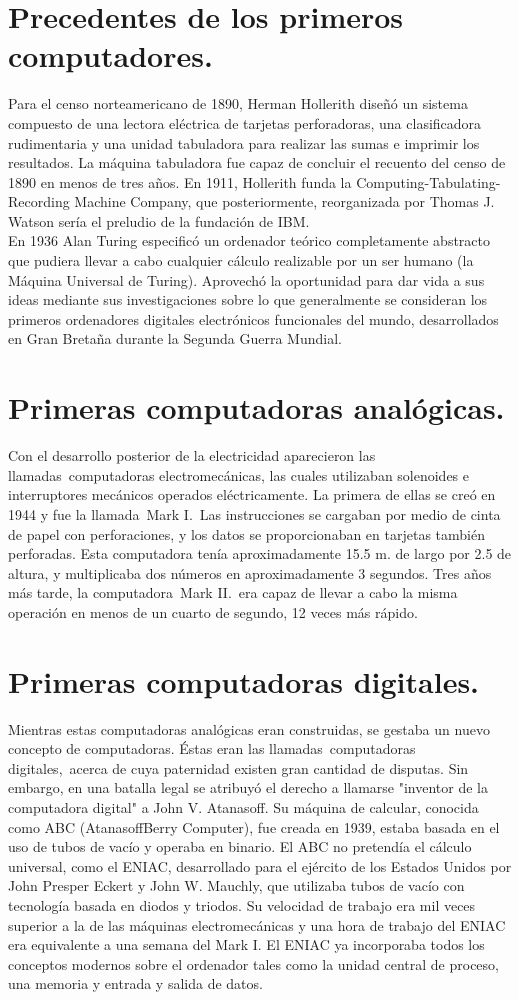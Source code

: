 \documentclass{book} %
\begin{document}
\section{Precedentes de los primeros computadores.}
Para el censo norteamericano de 1890, Herman Hollerith diseñó un sistema compuesto de una lectora eléctrica de tarjetas perforadoras, una clasificadora rudimentaria y una unidad tabuladora para realizar las sumas e imprimir los resultados. La máquina tabuladora fue capaz de concluir el recuento del censo de 1890 en menos de tres años. En 1911, Hollerith funda la Computing-Tabulating-Recording Machine Company, que posteriormente, reorganizada por Thomas J. Watson sería el preludio de la fundación de IBM. \\En 1936 Alan Turing especificó un ordenador teórico completamente abstracto que pudiera llevar a cabo cualquier cálculo realizable por un ser humano (la Máquina Universal de Turing). Aprovechó la oportunidad para dar vida a sus ideas mediante sus investigaciones sobre lo que generalmente se consideran los primeros ordenadores digitales electrónicos funcionales del mundo, desarrollados en Gran Bretaña durante la Segunda Guerra Mundial.
\section{Primeras computadoras analógicas.}
Con el desarrollo posterior de la electricidad aparecieron las llamadas computadoras electromecánicas, las cuales utilizaban solenoides e interruptores mecánicos operados eléctricamente. La primera de ellas se creó en 1944 y fue la llamada Mark I. Las instrucciones se cargaban por medio de cinta de papel con perforaciones, y los datos se proporcionaban en tarjetas también perforadas. Esta computadora tenía aproximadamente 15.5 m. de largo por 2.5 de altura, y multiplicaba dos números en aproximadamente 3 segundos. Tres años más tarde, la computadora Mark II. era capaz de llevar a cabo la misma operación en menos de un cuarto de segundo, 12 veces más rápido.
\section*{Primeras computadoras digitales.}
Mientras estas computadoras analógicas eran construidas, se gestaba un nuevo concepto de computadoras. Éstas eran las llamadas computadoras digitales, acerca de cuya paternidad existen gran cantidad de disputas. Sin embargo, en una batalla legal se atribuyó el derecho a llamarse "inventor de la computadora digital" a John V. Atanasoff. Su máquina de calcular, conocida como ABC (AtanasoffBerry Computer), fue creada en 1939, estaba basada en el uso de tubos de vacío y operaba en binario. 
El ABC no pretendía el cálculo universal, como el ENIAC, desarrollado para el ejército de los Estados Unidos por John Presper Eckert y John W. Mauchly, que utilizaba tubos de vacío con tecnología basada en diodos y triodos. Su velocidad de trabajo era mil veces superior a la de las máquinas electromecánicas y una hora de trabajo del ENIAC era equivalente a una semana del Mark I. El ENIAC ya incorporaba todos los conceptos modernos sobre el ordenador tales como la unidad central de proceso, una memoria y entrada y salida de datos. 
\end{document}
